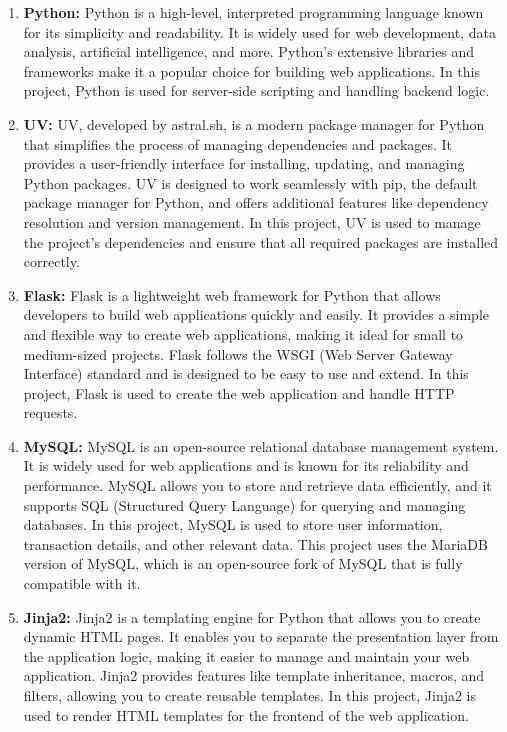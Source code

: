 \begin{enumerate}
  \item \textbf{Python:}
    Python is a high-level, interpreted programming language known for its
    simplicity and readability. It is widely used for web development, data
    analysis, artificial intelligence, and more. Python's extensive libraries
    and frameworks make it a popular choice for building web applications. In
    this project, Python is used for server-side scripting and handling
    backend logic.

  \item \textbf{UV:}
    UV, developed by astral.sh, is a modern package manager for Python that
    simplifies the process of managing dependencies and packages. It provides a
    user-friendly interface for installing, updating, and managing Python
    packages. UV is designed to work seamlessly with pip, the default package
    manager for Python, and offers additional features like dependency
    resolution and version management. In this project, UV is used to manage
    the project's dependencies and ensure that all required packages are
    installed correctly.

  \item \textbf{Flask:}
    Flask is a lightweight web framework for Python that allows developers to
    build web applications quickly and easily. It provides a simple and
    flexible way to create web applications, making it ideal for small to
    medium-sized projects. Flask follows the WSGI (Web Server Gateway
    Interface) standard and is designed to be easy to use and extend. In this
    project, Flask is used to create the web application and handle HTTP
    requests.

  \item \textbf{MySQL:}
    MySQL is an open-source relational database management system. It is widely
    used for web applications and is known for its reliability and performance.
    MySQL allows you to store and retrieve data efficiently, and it supports
    SQL (Structured Query Language) for querying and managing databases. In
    this project, MySQL is used to store user information, transaction details,
    and other relevant data. This project uses the MariaDB version of MySQL,
    which is an open-source fork of MySQL that is fully compatible with it.

  \item \textbf{Jinja2:}
    Jinja2 is a templating engine for Python that allows you to create dynamic
    HTML pages. It enables you to separate the presentation layer from the
    application logic, making it easier to manage and maintain your web
    application. Jinja2 provides features like template inheritance, macros,
    and filters, allowing you to create reusable templates. In this project,
    Jinja2 is used to render HTML templates for the frontend of the web
    application.


\end{enumerate}
